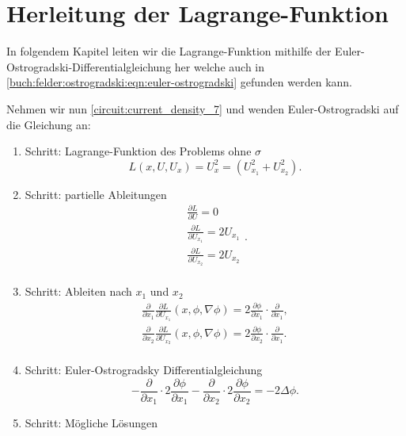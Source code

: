\section{Herleitung der Lagrange-Funktion}
In folgendem Kapitel leiten wir die Lagrange-Funktion mithilfe der Euler-Ostrogradski-Differentialgleichung her welche auch in \eqref{buch:felder:ostrogradski:eqn:euler-ostrogradski} gefunden werden kann.

Nehmen wir nun \eqref{circuit:current_density_7} und wenden Euler-Ostrogradski auf die Gleichung an:
\begin{enumerate}
	\item Schritt: Lagrange-Funktion des Problems ohne $\sigma$
	\begin{equation}
		L(x, U, U_x)= U_x^2 = \left(U_{x_1}^2+U_{x_2}^2\right).
	\end{equation}
	\item Schritt: partielle Ableitungen
	\begin{equation}
		\begin{aligned}
			\frac{\partial L}{\partial U}=0\\
			\frac{\partial L}{\partial U_{x_1}}=2U_{x_1}\\
			\frac{\partial L}{\partial U_{x_2}}=2U_{x_2}\\
		\end{aligned}.
	\end{equation}
	\item Schritt: Ableiten nach $x_1$ und $x_2$
	\begin{equation}
		\begin{aligned}
			\frac{\partial}{\partial x_1}\frac{\partial L}{\partial U_{x_1}}(x,\phi,\nabla \phi)=2\frac{\partial \phi}{\partial {x_1}}\cdot \frac{\partial}{\partial x_1},\\
			\frac{\partial}{\partial x_2}\frac{\partial L}{\partial U_{x_2}}(x,\phi,\nabla \phi)=2\frac{\partial \phi}{\partial {x_2}} \cdot \frac{\partial}{\partial x_1}.\\
		\end{aligned}
	\end{equation}
	\item Schritt: Euler-Ostrogradsky Differentialgleichung
	\begin{equation}
		-\frac{\partial}{\partial x_1}\cdot 2\frac{\partial \phi}{\partial {x_1}}-\frac{\partial}{\partial x_2}\cdot 2\frac{\partial \phi}{\partial {x_2}}=-2\Delta\phi.
	\end{equation}
	\item Schritt: Mögliche Lösungen

\end{enumerate}
